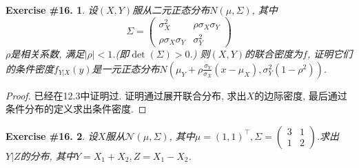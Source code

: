 \documentclass[UTF8, a4paper]{article}
\newtheorem{exercise}{Exercise \#16.}
\begin{document}
\begin{framed}
\begin{exercise}
设\((X,Y)\)服从二元正态分布\(N(\mu, \Sigma)\), 其中
$$
\Sigma=\left(\begin{array}{cc}
\sigma_X^2 & \rho \sigma_X \sigma_Y \\
\rho \sigma_X \sigma_Y & \sigma_Y^2
\end{array}\right)
$$
\(\rho\)是相关系数, 满足\(|\rho| < 1\).(即\(\det(\Sigma) > 0\).)
则\((X,Y)\)的联合密度为\(f\), 证明它们的条件密度\(f_{Y|X}(y)\)是一元正态分布\(N\left(\mu_Y + \rho \frac{\sigma_Y}{\sigma_X}(x - \mu_X), \sigma_Y^2(1 - \rho^2)\right)\).
\end{exercise}
\end{framed}

\begin{proof}
    已经在12.3中证明过. 证明通过展开联合分布, 求出\(X\)的边际密度, 最后通过条件分布的定义求出条件密度.
\end{proof}



\begin{framed}
\begin{exercise}
设\(X\)服从\(\mathcal{N}(\mu, \Sigma)\), 其中\(\mu = (1, 1)^\top, \Sigma=\left(\begin{array}{cc}
    3 & 1 \\
    1 & 2
    \end{array}\right)\).求出\(Y|Z\)的分布, 其中\(Y = X_1 + X_2, Z = X_1 - X_2\).
\end{exercise}
\end{framed}
\end{document}
